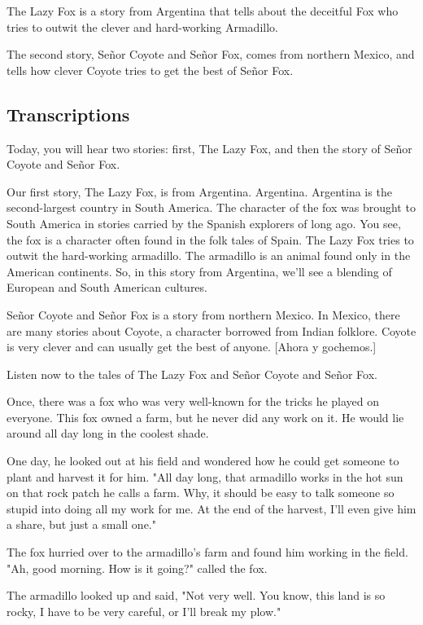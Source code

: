 The Lazy Fox is a story from Argentina that tells about the deceitful Fox who tries to outwit the clever and hard-working Armadillo.

The second story, Señor Coyote and Señor Fox, comes from northern Mexico, and tells how clever Coyote tries to get the best of Señor Fox.

\subsection{Transcriptions}

Today, you will hear two stories: first, The Lazy Fox, and then the story of Señor Coyote and Señor Fox.

Our first story, The Lazy Fox, is from Argentina. Argentina. Argentina is the second-largest country in South America. The character of the fox was brought to South America in stories carried by the Spanish explorers of long ago. You see, the fox is a character often found in the folk tales of Spain. The Lazy Fox tries to outwit the hard-working armadillo. The armadillo is an animal found only in the American continents. So, in this story from Argentina, we'll see a blending of European and South American cultures.

Señor Coyote and Señor Fox is a story from northern Mexico. In Mexico, there are many stories about Coyote, a character borrowed from Indian folklore. Coyote is very clever and can usually get the best of anyone. [Ahora y gochemos.]

Listen now to the tales of The Lazy Fox and Señor Coyote and Señor Fox.

Once, there was a fox who was very well-known for the tricks he played on everyone. This fox owned a farm, but he never did any work on it. He would lie around all day long in the coolest shade.

One day, he looked out at his field and wondered how he could get someone to plant and harvest it for him. "All day long, that armadillo works in the hot sun on that rock patch he calls a farm. Why, it should be easy to talk someone so stupid into doing all my work for me. At the end of the harvest, I'll even give him a share, but just a small one."

The fox hurried over to the armadillo's farm and found him working in the field. "Ah, good morning. How is it going?" called the fox.

The armadillo looked up and said, "Not very well. You know, this land is so rocky, I have to be very careful, or I'll break my plow."

